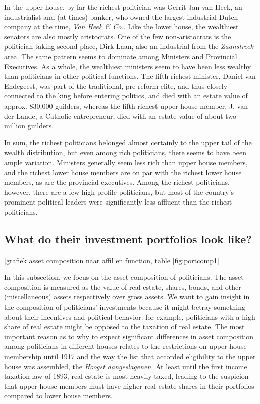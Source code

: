    In the upper house, by far the richest politician was Gerrit Jan van Heek, an industrialist and (at times) banker, who owned the largest industrial Dutch company at the time, \textit{Van Heek \& Co.}. Like the lower house, the wealthiest senators are also mostly aristocrats. One of the few non-aristocrats is the politician taking second place, Dirk Laan, also an industrial from the \textit{Zaanstreek} area. The same pattern seems to dominate among Ministers and Provincial Executives. As a whole, the wealthiest ministers seem to have been less wealthy than politicians in other political functions. The fifth richest minister, Daniel van Endegeest, was part of the traditional, pre-reform elite, and thus closely connected to the king before entering politics, and died with an estate value of approx. 830,000 guilders, whereas the fifth richest upper house member, J. van der Lande, a Catholic entrepreneur, died with an estate value of about two million guilders. 
    
    In sum, the richest politicians belonged almost certainly to the upper tail of the wealth distribution, but even among rich politicians, there seems to have been ample variation. Ministers generally seem less rich than upper house members, and the richest lower house members are on par with the richest lower house members, as are the provincial executives. Among the richest politicians, however, there are a few high-profile politicians, but most of the country's prominent political leaders were significantly less affluent than the richest politicians. 

\subsection{What do their investment portfolios look like?}

\begin{center}    
    [grafiek asset composition naar affil en function, table \ref{fig:portcomp1}]
    
\end{center}
    
    In this subsection, we focus on the asset composition of politicians. The asset composition is measured as the value of real estate, shares, bonds, and other (miscellaneous) assets respectively over gross assets. We want to gain insight in the composition of politicians' investments because it might betray something about their incentives and political behavior: for example, politicians with a high share of real estate might be opposed to the taxation of real estate. The most important reason as to why to expect significant differences in asset composition among politicians in different houses relates to the restrictions on upper house membership until 1917 and the way the list that accorded eligibility to the upper house was assembled, the \textit{Hoogst aangeslagenen}. At least until the first income taxation law of 1893, real estate is most heavily taxed, leading to the suspicion that upper house members must have higher real estate shares in their portfolios compared to lower house members. 
    
